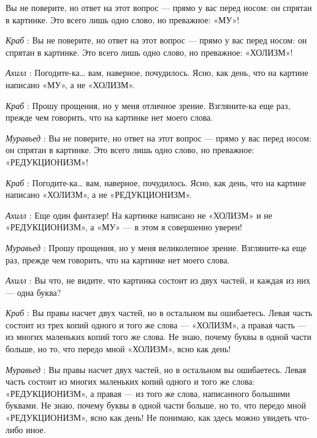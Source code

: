 \documentclass[../main.tex]{subfiles}
\begin{document}


\begin{dialogue}

 Вы не поверите, но ответ на этот вопрос --- прямо у вас перед носом: он спрятан в картинке. Это всего лишь одно слово, но преважное: «МУ»!

\emph{Краб} : Вы не поверите, но ответ на этот вопрос --- прямо у вас перед носом: он спрятан в картинке. Это всего лишь одно слово, но преважное: «ХОЛИЗМ»!

\emph{Ахилл} : Погодите-ка\ldots{} вам, наверное, почудилось. Ясно, как день, что на картине написано «МУ», а не «ХОЛИЗМ».

\emph{Краб} : Прошу прощения, но у меня отличное зрение. Взгляните-ка еще раз, прежде чем говорить, что на картинке нет моего слова.

\emph{Муравьед} : Вы не поверите, но ответ на этот вопрос --- прямо у вас перед носом: он спрятан в картинке. Это всего лишь одно слово, но преважное: «РЕДУКЦИОНИЗМ»!

\emph{Краб} : Погодите-ка\ldots{} вам, наверное, почудилось. Ясно, как день, что на картине написано «ХОЛИЗМ», а не «РЕДУКЦИОНИЗМ».

\emph{Ахилл} : Еще один фантазер! На картинке написано не «ХОЛИЗМ» и не «РЕДУКЦИОНИЗМ», а «МУ» --- в этом я совершенно уверен!

\emph{Муравьед} : Прошу прощения, но у меня великолепное зрение. Взгляните-ка еще раз, прежде чем говорить, что на картинке нет моего слова.

\emph{Ахилл} : Вы что, не видите, что картинка состоит из двух частей, и каждая из них --- одна буква?

\emph{Краб} : Вы правы насчет двух частей, но в остальном вы ошибаетесь. Левая часть состоит из трех копий одного и того же слова --- «ХОЛИЗМ», а правая часть --- из многих маленьких копий того же слова. Не знаю, почему буквы в одной части больше, но то, что передо мной «ХОЛИЗМ», ясно как день!

\emph{Муравьед} : Вы правы насчет двух частей, но в остальном вы ошибаетесь. Левая часть состоит из многих маленьких копий одного и того же слова: «РЕДУКЦИОНИЗМ», а правая --- из того же слова, написанного большими буквами. Не знаю, почему буквы в одной части больше, но то, что передо мной «РЕДУКЦИОНИЗМ», ясно как день! Не понимаю, как здесь можно увидеть что-либо иное.


\end{dialogue}
\end{document}
